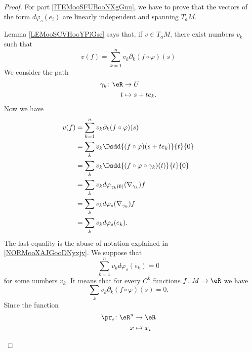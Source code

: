 \begin{proof}
	For part \ref{ITEMooSFUBooNXgGuu}, we have to prove that the vectors of the form \( d\varphi_s(e_i)\) are linearly independent and spanning \( T_aM\).
	\begin{subproof}
		\spitem[Spanning]
		Lemma \ref{LEMooSCVHooYPiGse} says that, if \( v\in T_aM\), there exist numbers \( v_k\) such that
		\begin{equation}
			v(f)=\sum_{k=1}^nv_k\partial_k(f\circ\varphi)(s)
		\end{equation}
		We consider the path
		\begin{equation}
			\begin{aligned}
				\gamma_k\colon \eR & \to U           \\
				t                  & \mapsto s+te_k.
			\end{aligned}
		\end{equation}
		Now we have
		\begin{subequations}
			\begin{align}
				v(f) & =\sum_{k=1}^nv_k\partial_k(f\circ\varphi)(s)             \\
				     & =\sum_kv_k\Dsdd{ (f\circ\varphi)(s+te_k) }{t}{0}         \\
				     & =\sum_kv_k\Dsdd{ (f\circ\varphi\circ\gamma_k)(t) }{t}{0} \\
				     & =\sum_kv_kd\varphi_{\gamma_k(0)}(\nabla_{\gamma_k})f     \\
				     & =\sum_kv_kd\varphi_s(\nabla_{\gamma_k})f                 \\
				     & =\sum_kv_kd\varphi_s(e_k).
			\end{align}
		\end{subequations}
		The last equality is the abuse of notation explained in \ref{NORMooXAJGooDNyxjv}.
		\spitem[Independent]
		We suppose that
		\begin{equation}
			\sum_{k=1}^nv_kd\varphi_s(e_k)=0
		\end{equation}
		for some numbers \( v_k\). It means that for every \( C^k\) functions \( f\colon M\to \eR\) we have
		\begin{equation}
			\sum_{k}v_k\partial_k(f\circ \varphi)(s)=0.
		\end{equation}
		Since the function
		\begin{equation}
			\begin{aligned}
				\pr_i\colon \eR^n & \to \eR     \\
				x                 & \mapsto x_i
			\end{aligned}

\end{equation}
\end{subproof}
\end{proof}
